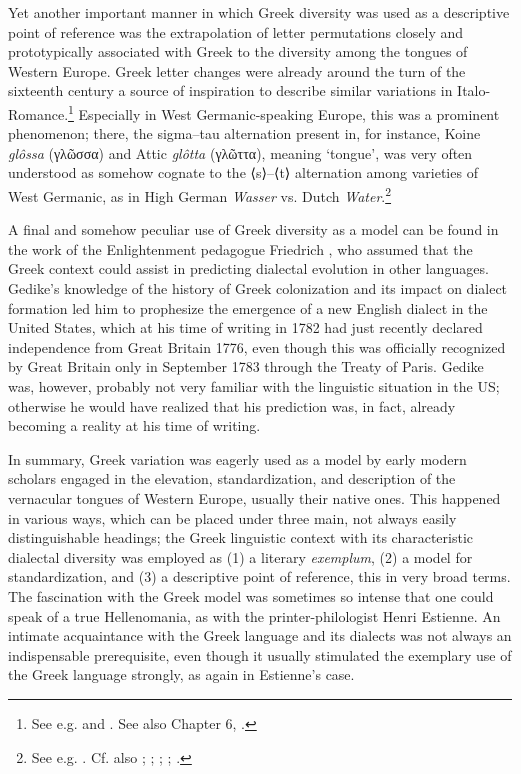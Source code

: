 Yet another important manner in which Greek diversity was used as a descriptive point of reference was the extrapolation of letter permutations closely and prototypically associated with Greek to the diversity among the tongues of Western Europe. Greek letter changes were already around the turn of the sixteenth century a source of inspiration to describe similar variations in Italo-Romance.\footnote{See e.g. \citet[*.ii\textsc{\textsuperscript{v}}]{Manutius1496} and \citet[97\textsc{\textsuperscript{r}}]{Da1509}. See also Chapter 6, .} Especially in West Germanic-speaking Europe, this was a prominent phenomenon; there, the sigma–tau alternation present in, for instance, Koine \textit{glôssa} (γλῶσσα) and Attic \textit{glôtta} (γλῶττα), meaning ‘tongue’, was very often understood as somehow cognate to the ⟨s⟩–⟨t⟩ alternation among varieties of West Germanic, as in High German \textit{Wasser} vs. Dutch \textit{Water}.\footnote{See e.g. \citet[21]{Mylius1612}. Cf. also \citet[\textsc{m}.ii\textsc{\textsuperscript{r}}]{Althamer1536}; \citet[\textsc{a.3}\textsc{\textsuperscript{r}}]{Chytraeus1582}; \citet[119--132]{Reitz1730}; \citet[61--62]{Ruhig1745}; \citet[23--24]{Hof1772}.}

A final and somehow peculiar use of Greek diversity as a model can be found in the work of the Enlightenment pedagogue Friedrich \citet[7]{Gedike1782}, who assumed that the Greek context could assist in predicting dialectal evolution in other languages. Gedike’s knowledge of the history of Greek colonization and its impact on dialect formation led him to prophesize the emergence of a new English dialect in the United States, which at his time of writing in 1782 had just recently declared independence from Great Britain 1776, even though this was officially recognized by Great Britain only in September 1783 through the Treaty of Paris. Gedike was, however, probably not very familiar with the linguistic situation in the US; otherwise he would have realized that his prediction was, in fact, already becoming a reality at his time of writing.

In summary, Greek variation was eagerly used as a model by early modern scholars engaged in the elevation, standardization, and description of the vernacular tongues of Western Europe, usually their native ones. This happened in various ways, which can be placed under three main, not always easily distinguishable headings; the Greek linguistic context with its characteristic dialectal diversity was employed as (1) a literary \textit{exemplum}, (2) a model for standardization, and (3) a descriptive point of reference, this in very broad terms. The fascination with the Greek model was sometimes so intense that one could speak of a true Hellenomania, as with the printer-philologist Henri Estienne. An intimate acquaintance with the Greek language and its dialects was not always an indispensable prerequisite, even though it usually stimulated the exemplary use of the Greek language strongly, as again in Estienne’s case.

